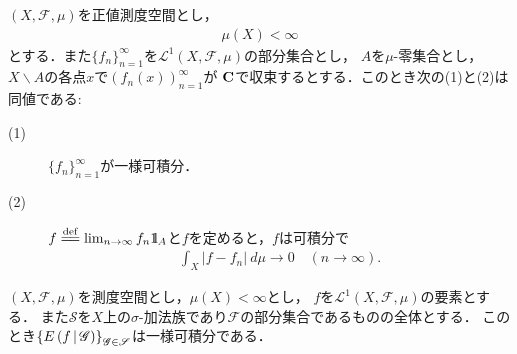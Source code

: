 	\begin{screen}
	\begin{thm}[一様可積分性と平均収束]\label{lem:uniformly_integrable_and_convergence_in_mean}
		$(X,\mathscr{F},\mu)$を正値測度空間とし，
		\begin{align}
			\mu(X) < \infty
		\end{align}
		とする．また$\{f_n\}_{n=1}^\infty$を$\mathscr{L}^1(X,\mathscr{F},\mu)$の部分集合とし，
		$A$を$\mu$-零集合とし，$X \backslash A$の各点$x$で$(f_n(x))_{n=1}^\infty$が
		$\mathbf{C}$で収束するとする．このとき次の(1)と(2)は同値である:
		\begin{description}
			\item[(1)] $\{f_n\}_{n=1}^\infty$が一様可積分．
			\item[(2)] $f \defeq \lim_{n \to \infty} f_n \defunc_A$と$f$を定めると，$f$は可積分で
				\begin{align}
					\int_X |f - f_n|\ d\mu 
					\longrightarrow 0
					\quad (n \longrightarrow \infty).
				\end{align}
		\end{description}
	\end{thm}
	\end{screen}
	
	\begin{sketch}
		
	\end{sketch}
	
	\begin{screen}
	\begin{thm}[一様可積分性と条件付き期待値]\label{lem:uniformly_integrability_and_conditional_expectations}
		$(X,\mathscr{F},\mu)$を測度空間とし，$\mu(X) < \infty$とし，
		$f$を$\mathscr{L}^1(X,\mathscr{F},\mu)$の要素とする．
		また$\mathscr{S}$を$X$上の$\sigma$-加法族であり$\mathscr{F}$の部分集合であるものの全体とする．
		このとき$\left\{ E\left( f \, \middle|\, \mathscr{G} \right) \right\}_{\mathscr{G} \in \mathscr{S}}$は一様可積分である．
	\end{thm}
	\end{screen}
	
